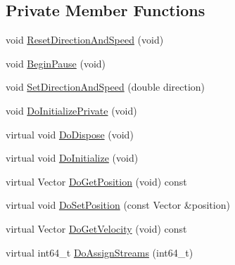 \subsection*{Private Member Functions}
\begin{DoxyCompactItemize}
\item 
void \hyperlink{classns3_1_1RandomDirection2dMobilityModel_acc1e4eab8e75a20854938b0616bb9c79}{Reset\+Direction\+And\+Speed} (void)
\item 
void \hyperlink{classns3_1_1RandomDirection2dMobilityModel_a95bf0e9129301ca8cf51fcd1bf665a17}{Begin\+Pause} (void)
\item 
void \hyperlink{classns3_1_1RandomDirection2dMobilityModel_a29c1abbed69775374f52c5635cadd5d9}{Set\+Direction\+And\+Speed} (double direction)
\item 
void \hyperlink{classns3_1_1RandomDirection2dMobilityModel_a8240bba0ddc6f386bda3ebf96b383a6a}{Do\+Initialize\+Private} (void)
\item 
virtual void \hyperlink{classns3_1_1RandomDirection2dMobilityModel_a34b6fa8a4ae2e31462c2fbff3e6f86d0}{Do\+Dispose} (void)
\item 
virtual void \hyperlink{classns3_1_1RandomDirection2dMobilityModel_acda447352283b800003b657128927cc6}{Do\+Initialize} (void)
\item 
virtual Vector \hyperlink{classns3_1_1RandomDirection2dMobilityModel_ad1715c84a5f9d433a2fdbc34ac16af82}{Do\+Get\+Position} (void) const 
\item 
virtual void \hyperlink{classns3_1_1RandomDirection2dMobilityModel_ae35094b50443320f1ebab5beed22cc34}{Do\+Set\+Position} (const Vector \&position)
\item 
virtual Vector \hyperlink{classns3_1_1RandomDirection2dMobilityModel_aa35c9d8d06565e4eecdb51a80596705f}{Do\+Get\+Velocity} (void) const 
\item 
virtual int64\+\_\+t \hyperlink{classns3_1_1RandomDirection2dMobilityModel_a20c5d0ad77c5502e99ebd3648d7aa4c5}{Do\+Assign\+Streams} (int64\+\_\+t)
\end{DoxyCompactItemize}
